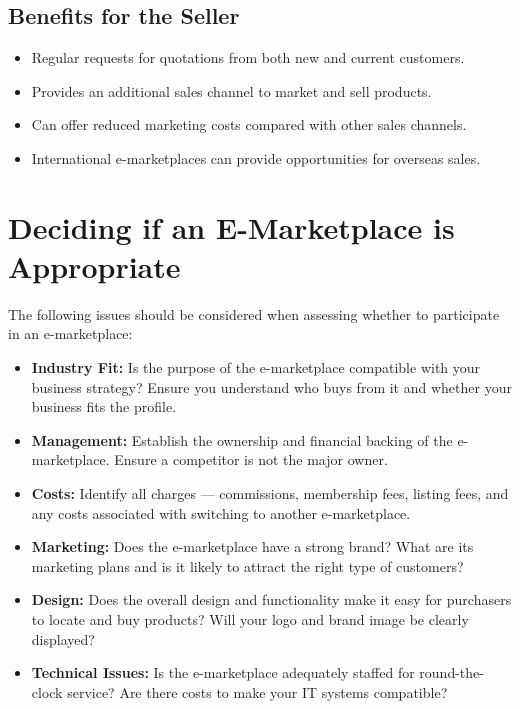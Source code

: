 \documentclass[12pt,a4paper]{article}
\begin{document}
\subsection{Benefits for the Seller}
\begin{itemize}
    \item Regular requests for quotations from both new and current customers.
    \item Provides an additional sales channel to market and sell products.
    \item Can offer reduced marketing costs compared with other sales channels.
    \item International e-marketplaces can provide opportunities for overseas sales.
\end{itemize}

\section{Deciding if an E-Marketplace is Appropriate}

The following issues should be considered when assessing whether to participate in an e-marketplace:

\begin{itemize}
    \item \textbf{Industry Fit:} Is the purpose of the e-marketplace compatible with your business strategy? Ensure you understand who buys from it and whether your business fits the profile.
    \item \textbf{Management:} Establish the ownership and financial backing of the e-marketplace. Ensure a competitor is not the major owner.
    \item \textbf{Costs:} Identify all charges --- commissions, membership fees, listing fees, and any costs associated with switching to another e-marketplace.
    \item \textbf{Marketing:} Does the e-marketplace have a strong brand? What are its marketing plans and is it likely to attract the right type of customers?
    \item \textbf{Design:} Does the overall design and functionality make it easy for purchasers to locate and buy products? Will your logo and brand image be clearly displayed?
    \item \textbf{Technical Issues:} Is the e-marketplace adequately staffed for round-the-clock service? Are there costs to make your IT systems compatible?
\end{itemize}
\end{document}
